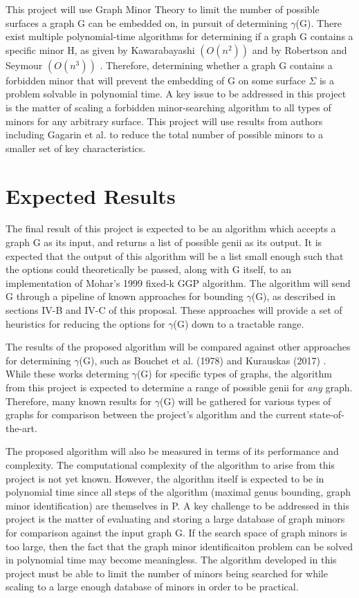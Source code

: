 \documentclass[12pt,conference]{IEEEtran}
\begin{document}
This project will use Graph Minor Theory to limit the number of possible surfaces a graph G can be embedded on, in pursuit of determining $\gamma$(G). There exist multiple polynomial-time algorithms for determining if a graph G contains a specific minor H, as given by Kawarabayashi $(O(n^2))$ \cite{kawarabayashi} and by Robertson and Seymour $(O(n^3))$ \cite{graph-minors-13}. Therefore, determining whether a graph G contains a forbidden minor that will prevent the embedding of G on some surface $\Sigma$ is a problem solvable in polynomial time. A key issue to be addressed in this project is the matter of scaling a forbidden minor-searching algorithm to all types of minors for any arbitrary surface. This project will use results from authors including Gagarin et al. \cite{gagarin-kocay} to reduce the total number of possible minors to a smaller set of key characteristics.

\section{Expected Results}

The final result of this project is expected to be an algorithm which accepts a graph G as its input, and returns a list of possible genii as its output. It is expected that the output of this algorithm will be a list small enough such that the options could theoretically be passed, along with G itself, to an implementation of Mohar's 1999 fixed-k GGP algorithm. The algorithm will send G through a pipeline of known approaches for bounding $\gamma$(G), as described in sections IV-B and IV-C of this proposal. These approaches will provide a set of heuristics for reducing the options for $\gamma$(G) down to a tractable range. 

The results of the proposed algorithm will be compared against other approaches for determining $\gamma$(G), such as Bouchet et al. (1978) \cite{bouchet} and Kurauskas (2017) \cite{kurauskas}. While these works determing $\gamma$(G) for specific types of graphs, the algorithm from this project is expected to determine a range of possible genii for \textit{any} graph. Therefore, many known results for $\gamma$(G) will be gathered for various types of graphs for comparison between the project's algorithm and the current state-of-the-art.

The proposed algorithm will also be measured in terms of its performance and complexity. The computational complexity of the algorithm to arise from this project is not yet known. However, the algorithm itself is expected to be in polynomial time since all steps of the algorithm (maximal genus bounding, graph minor identification) are themselves in P. A key challenge to be addressed in this project is the matter of evaluating and storing a large database of graph minors for comparison against the input graph G. If the search space of graph minors is too large, then the fact that the graph minor identificaiton problem can be solved in polynomial time may become meaningless. The algorithm developed in this project must be able to limit the number of minors being searched for while scaling to a large enough database of minors in order to be practical. 
\end{document}
